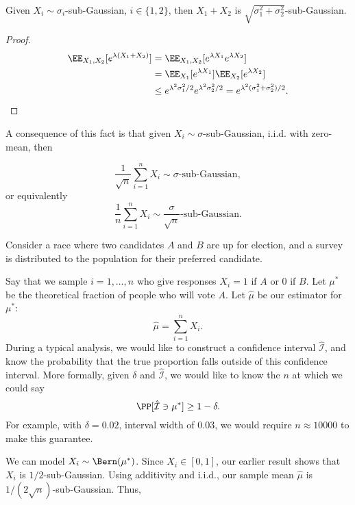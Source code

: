 \begin{theorem}

Given $X_i\sim \sigma_i$-sub-Gaussian, $i\in \{1,2\}$, then $X_1+X_2$ is $\sqrt{\sigma_1^2+\sigma_2^2}$-sub-Gaussian. 
\end{theorem}

\begin{proof}
\begin{align*}
	\EE_{X_1,X_2}[e^{\lambda(X_1+X_2)}] &= \EE_{X_1,X_2}[e^{\lambda X_1}e^{\lambda X_2}] \\
																			&= \EE_{X_1}[e^{\lambda X_1}]\EE_{X_2}[e^{\lambda X_2}] \\
																			&\leq e^{\lambda^2\sigma_1^2/2}e^{\lambda^2\sigma_2^2/2} = e^{\lambda^2(\sigma_1^2+\sigma_2^2)/2}.
\end{align*}
\end{proof}
A consequence of this fact is that given $X_i\sim \sigma$-sub-Gaussian, i.i.d. with zero-mean, then 

\[\frac{1}{\sqrt{n}}\sum_{i=1}^n X_i\sim \sigma\text{-sub-Gaussian},\] 
or equivalently 
\[\frac{1}{n}\sum_{i=1}^n X_i\sim \frac{\sigma}{\sqrt{n}}\text{-sub-Gaussian}.\] 

\begin{example}

Consider a race where two candidates $A$ and $B$ are up for election, and a survey is distributed to the population for their preferred candidate.
\end{example}

Say that we sample $i=1, \hdots, n$ who give responses $X_i = 1$ if $A$ or $0$ if $B$. Let $\mu^*$ be the theoretical fraction of people who will vote $A$. Let $\hat{\mu}$ be our estimator for $\mu^*$: 
\[\hat{\mu} = \sum_{i=1}^n X_i.\]
During a typical analysis, we would like to construct a confidence interval $\hat{\mathcal{I}}$, and know the probability that the true proportion falls outside of this confidence interval. More formally, given $\delta$ and $\hat{\mathcal{I}}$, we would like to know the $n$ at which we could say 
\[\PP[\hat{\mathcal{I}}\ni \mu^{*}] \geq 1-\delta.\] 
For example, with $\delta=0.02$, interval width of $0.03$, we would require $n\approx 10000$ to make this guarantee.  

We can model $X_i\sim \Bern(\mu^*)$. Since $X_i\in [0,1]$, our earlier result shows that $X_i$ is $1/2$-sub-Gaussian. Using additivity and i.i.d., our sample mean $\hat{\mu}$ is $1/(2\sqrt{n})$-sub-Gaussian. Thus, 

